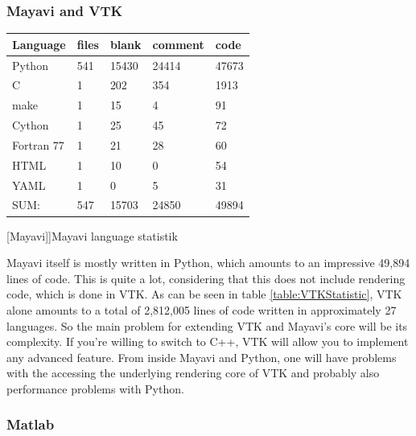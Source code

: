 \subsubsection{Mayavi and VTK}
\begin{table}[htbp]
    \centering
    \begin{tabular}{l|l|l|l|l}
        \hline
        \textbf{Language} &    \textbf{files} &    \textbf{blank} &  \textbf{comment} &  \textbf{code}\\
        \hline
        Python          &               541      &    15430     &    24414   &       47673\\
        C               &                 1      &     202      &      354   &      1913\\
        make            &                 1      &       15     &         4  &        91\\
        Cython          &                 1      &       25     &        45  &        72\\
        Fortran 77      &                 1      &       21     &        28  &        60\\
        HTML            &                 1      &       10     &         0  &        54\\
        YAML            &                 1      &        0     &        5   &       31\\
        \hline
        SUM:            &               547       &   15703     &     24850  &       49894\\
        \hline
        \end{tabular}
    [Mayavi]]{Mayavi language statistik}
    \label{table:mayavistatistic}
\end{table}

Mayavi itself is mostly written in Python, which amounts to an impressive 49,894 lines of code. This is quite a lot, considering that this does not include rendering code, which is done in VTK.
As can be seen in table \ref{table:VTKStatistic}, VTK alone amounts to a total of 2,812,005 lines of code written in approximately 27 languages. 
So the main problem for extending VTK and Mayavi's core will be its complexity. If you're willing to switch to C++, VTK will allow you to implement any advanced feature. From inside Mayavi and Python, one will have problems with the accessing the underlying rendering core of VTK and probably also performance problems with Python.


\subsubsection{Matlab}

